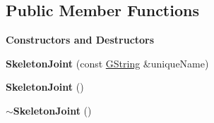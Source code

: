 \subsection*{Public Member Functions}
\begin{Indent}\textbf{ Constructors and Destructors}\par
\begin{DoxyCompactItemize}
\item 
\mbox{\label{classrev_1_1_skeleton_joint_a738ffb43ef5a8da6d0e7d966165d15f7}} 
{\bfseries Skeleton\+Joint} (const \mbox{\hyperlink{classrev_1_1_g_string}{G\+String}} \&unique\+Name)
\item 
\mbox{\label{classrev_1_1_skeleton_joint_a4b0c82adfa28a59158f52b434f3d605d}} 
{\bfseries Skeleton\+Joint} ()
\item 
\mbox{\label{classrev_1_1_skeleton_joint_a4aac6f7a99d234bf5f0bd8fa857750b4}} 
{\bfseries $\sim$\+Skeleton\+Joint} ()
\end{DoxyCompactItemize}
\end{Indent}

